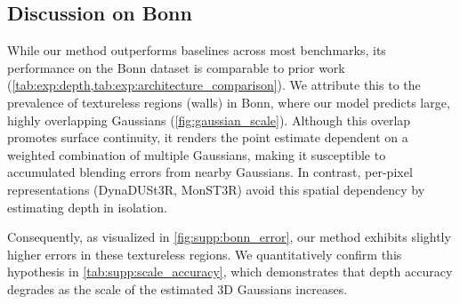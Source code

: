 \subsection{Discussion on Bonn}
\label{supp:discussion_bonn}
While our method outperforms baselines across most benchmarks, its performance on the Bonn dataset is comparable to prior work (\cref{tab:exp:depth,tab:exp:architecture_comparison}).
We attribute this to the prevalence of textureless regions (\eg walls) in Bonn, where our model predicts large, highly overlapping Gaussians (\cref{fig:gaussian_scale}).
Although this overlap promotes surface continuity, it renders the point estimate dependent on a weighted combination of multiple Gaussians, making it susceptible to accumulated blending errors from nearby Gaussians.
In contrast, per-pixel representations (\eg DynaDUSt3R, MonST3R) avoid this spatial dependency by estimating depth in isolation.

Consequently, as visualized in \cref{fig:supp:bonn_error}, our method exhibits slightly higher errors in these textureless regions. We quantitatively confirm this hypothesis in \cref{tab:supp:scale_accuracy}, which demonstrates that depth accuracy degrades as the scale of the estimated 3D Gaussians increases.


\begin{table}[ht]
\centering
\scriptsize
\setlength\tabcolsep{2pt}
\caption{
\textbf{Impact of Gaussian scale on geometry accuracy on Bonn.} We report Point EPE and Depth Abs.~Rel. across different ranges of estimated Gaussian scales. We observe that depth accuracy decreases along with the increased scale of estimated 3D Gaussians.}
\label{tab:supp:scale_accuracy}
\end{table}












